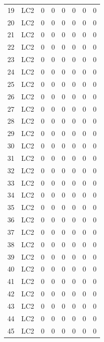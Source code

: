 \documentclass{article}%
\begin{document}
\begin{longtable}{| c c | c c c c c c |}
19&LC2&0&0&0&0&0&0\\%
20&LC2&0&0&0&0&0&0\\%
21&LC2&0&0&0&0&0&0\\%
22&LC2&0&0&0&0&0&0\\%
23&LC2&0&0&0&0&0&0\\%
24&LC2&0&0&0&0&0&0\\%
25&LC2&0&0&0&0&0&0\\%
26&LC2&0&0&0&0&0&0\\%
27&LC2&0&0&0&0&0&0\\%
28&LC2&0&0&0&0&0&0\\%
29&LC2&0&0&0&0&0&0\\%
30&LC2&0&0&0&0&0&0\\%
31&LC2&0&0&0&0&0&0\\%
32&LC2&0&0&0&0&0&0\\%
33&LC2&0&0&0&0&0&0\\%
34&LC2&0&0&0&0&0&0\\%
35&LC2&0&0&0&0&0&0\\%
36&LC2&0&0&0&0&0&0\\%
37&LC2&0&0&0&0&0&0\\%
38&LC2&0&0&0&0&0&0\\%
39&LC2&0&0&0&0&0&0\\%
40&LC2&0&0&0&0&0&0\\%
41&LC2&0&0&0&0&0&0\\%
42&LC2&0&0&0&0&0&0\\%
43&LC2&0&0&0&0&0&0\\%
44&LC2&0&0&0&0&0&0\\%
45&LC2&0&0&0&0&0&0\\%
\end{longtable}%
\end{document}
